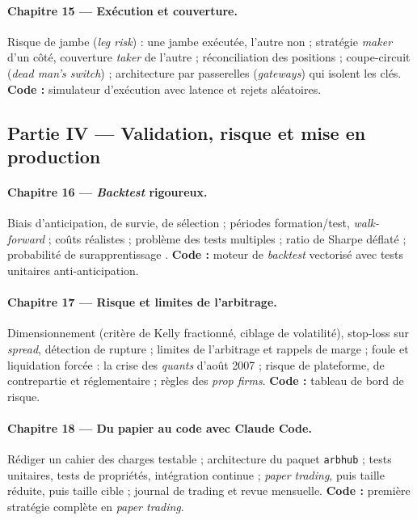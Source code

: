 \documentclass[11pt,a4paper]{article}
\begin{document}
\paragraph{Chapitre 15 — Exécution et couverture.}
Risque de jambe (\emph{leg risk}) : une jambe exécutée, l'autre non ; stratégie \emph{maker} d'un côté, couverture \emph{taker} de l'autre ; réconciliation des positions ; coupe-circuit (\emph{dead man's switch}) ; architecture par passerelles (\emph{gateways}) qui isolent les clés. \textbf{Code :} simulateur d'exécution avec latence et rejets aléatoires.

\subsection{Partie IV — Validation, risque et mise en production}

\paragraph{Chapitre 16 — \emph{Backtest} rigoureux.}
Biais d'anticipation, de survie, de sélection ; périodes formation/test, \emph{walk-forward} ; coûts réalistes ; problème des tests multiples \citep{harvey2016} ; ratio de Sharpe déflaté \citep{bailey2014dsr} ; probabilité de surapprentissage \citep{bailey2017pbo}. \textbf{Code :} moteur de \emph{backtest} vectorisé avec tests unitaires anti-anticipation.

\paragraph{Chapitre 17 — Risque et limites de l'arbitrage.}
Dimensionnement (critère de Kelly fractionné, ciblage de volatilité), stop-loss sur \emph{spread}, détection de rupture ; limites de l'arbitrage et rappels de marge \citep{shleifer1997} ; foule et liquidation forcée : la crise des \emph{quants} d'août 2007 \citep{khandanilo2011} ; risque de plateforme, de contrepartie et réglementaire ; règles des \emph{prop firms}. \textbf{Code :} tableau de bord de risque.

\paragraph{Chapitre 18 — Du papier au code avec Claude Code.}
Rédiger un cahier des charges testable ; architecture du paquet \texttt{arbhub} ; tests unitaires, tests de propriétés, intégration continue ; \emph{paper trading}, puis taille réduite, puis taille cible ; journal de trading et revue mensuelle. \textbf{Code :} première stratégie complète en \emph{paper trading}.
\end{document}
